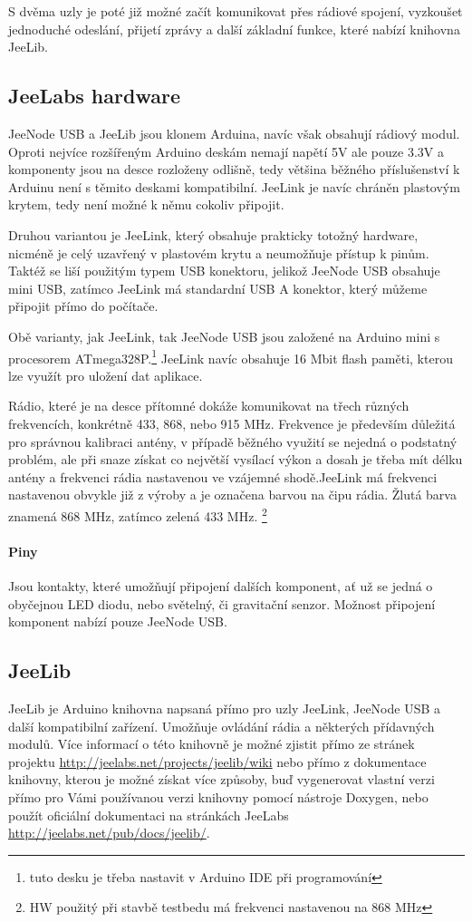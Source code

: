 \documentclass[12pt,titlepage]{article}
\begin{document}
	S dvěma uzly je poté již možné začít komunikovat přes rádiové spojení, vyzkoušet jednoduché odeslání, přijetí zprávy a další základní funkce, které nabízí knihovna JeeLib. 	
	

	\subsection{JeeLabs hardware}
		JeeNode USB a JeeLib jsou klonem Arduina, navíc však obsahují rádiový modul. Oproti nejvíce rozšířeným Arduino deskám nemají napětí 5V ale pouze 3.3V  a komponenty jsou na desce rozloženy odlišně, tedy většina běžného příslušenství k Arduinu není s těmito deskami kompatibilní. JeeLink je navíc chráněn plastovým krytem, tedy není možné k němu cokoliv připojit.
	
		Druhou variantou je JeeLink, který obsahuje prakticky totožný hardware, nicméně je celý uzavřený v plastovém krytu a neumožňuje přístup k pinům. Taktéž se liší použitým typem USB konektoru, jelikož JeeNode USB obsahuje mini USB, zatímco JeeLink má standardní USB A konektor, který můžeme připojit přímo do počítače. 
				
		Obě varianty, jak JeeLink, tak JeeNode USB jsou založené na Arduino mini s procesorem ATmega328P.\footnote{tuto desku je třeba nastavit v Arduino IDE při programování} JeeLink navíc obsahuje 16 Mbit flash paměti, kterou lze využít pro uložení dat aplikace.
		
		Rádio, které je na desce přítomné dokáže komunikovat na třech různých frekvencích, konkrétně 433, 868, nebo 915 MHz. Frekvence je především důležitá pro správnou kalibraci antény, v případě běžného využití se nejedná o podstatný problém, ale při snaze získat co největší vysílací výkon a dosah je třeba mít délku antény a frekvenci rádia nastavenou ve vzájemné shodě.JeeLink má frekvenci nastavenou obvykle již z výroby a je označena barvou na čipu rádia. Žlutá barva znamená 868 MHz, zatímco zelená 433 MHz. \footnote{HW použitý při stavbě testbedu má frekvenci nastavenou na 868 MHz}
		\paragraph{Piny}
	
		Jsou kontakty, které umožňují připojení dalších komponent, ať už se jedná o obyčejnou LED diodu, nebo světelný, či gravitační senzor. Možnost připojení komponent nabízí pouze JeeNode USB. 
	
	\subsection{JeeLib}
		JeeLib je Arduino knihovna napsaná přímo pro uzly JeeLink, JeeNode USB a další kompatibilní zařízení. Umožňuje ovládání rádia a některých přídavných modulů. Více informací o této knihovně je možné zjistit přímo ze stránek projektu \url{http://jeelabs.net/projects/jeelib/wiki} nebo přímo z dokumentace knihovny, kterou je možné získat více způsoby, buď vygenerovat vlastní verzi přímo pro Vámi používanou verzi knihovny pomocí nástroje Doxygen, nebo použít oficiální dokumentaci na stránkách JeeLabs \url{http://jeelabs.net/pub/docs/jeelib/}.
		
\end{document}
